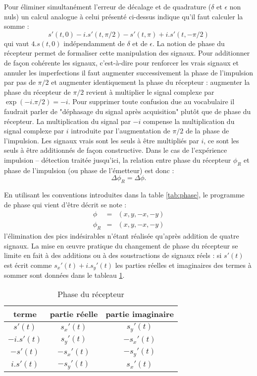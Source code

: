 Pour éliminer simultanément l'erreur de 
décalage et de quadrature ($\delta$ et $\epsilon$ non nuls) 
un calcul analogue à celui présenté ci-dessus indique qu'il faut calculer 
la somme :
\begin{equation}
	s'(t,0) - i.s'(t,\pi/2) - s'(t,\pi) + i.s'(t,-\pi/2)
\end{equation}
qui vaut $4.s(t,0)$ indépendamment de $\delta$ et de $\epsilon$. 
La notion de phase du récepteur permet de formaliser cette manipulation des signaux. 
Pour additionner de façon cohérente les signaux, 
c'est-à-dire pour renforcer les vrais signaux et annuler les 
imperfections il faut augmenter successivement la phase de l'impulsion par pas de $\pi/2$ et 
augmenter identiquement la phase du récepteur : 
augmenter la phase du récepteur 
de $\pi/2$ revient à multiplier le signal complexe par $\exp(-i.\pi/2) = -i$. 
Pour supprimer toute confusion due au vocabulaire il faudrait parler de 
"déphasage du signal après acquisition" plutôt que de phase du récepteur. 
La multiplication du signal par $-i$ compense la multiplication du 
signal complexe par $i$ introduite par l'augmentation  de $\pi/2$ de la phase de l'impulsion. 
Les signaux vrais sont les seuls à être multipliés par $i$, 
ce sont les seuls à être additionnés de façon constructive. 
Dans le cas de l'expérience impulsion -- détection traitée jusqu'ici, la 
relation entre phase du récepteur $\phi_R$ et phase de l'impulsion (ou phase de l'émetteur) 
est donc :
\begin{equation}
\Delta \phi_R = \Delta \phi.
\end{equation}

En utilisant les conventions introduites dans la table \ref{tab:phase},
le programme de phase qui vient d'être décrit se note :
\begin{eqnarray}
  \phi & = & (x, y, -x, -y) \\
\phi_R & = & (x, y, -x, -y)
\end{eqnarray}
l'élimination des pics indésirables n'étant réalisée qu'après addition de quatre signaux. 
La mise en {\oe}uvre pratique du changement de phase du récepteur se limite en fait à des 
additions ou à des soustractions de signaux réels : si $s'(t)$ est écrit comme $s_x'(t) + i.s_y'(t)$ 
les parties réelles et imaginaires des termes à sommer sont données dans le tableau \ref{tab:phasec}.

\begin{table}
\caption{Phase du récepteur}
\label{tab:phasec}
\begin{center}
\begin{tabular}[hbt]{ccc}
\hline
terme    &  partie réelle & partie imaginaire           \\ \hline
$s'(t)   $ & $s_x'(t) $ & $s_y'(t)$  \\
$-i.s'(t)$ & $s_y'(t) $ & $-s_x'(t)$ \\
$-s'(t)  $ & $-s_x'(t)$ & $-s_y'(t)$ \\
$i.s'(t) $ & $-s_y'(t)$ & $s_x'(t)$  \\
\hline
\end{tabular}
\end{center}  
\end{table}

